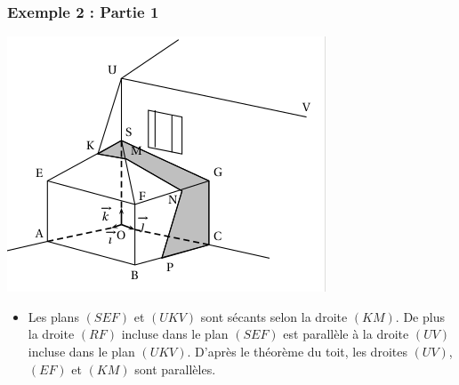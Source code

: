 \documentclass[xcolor=svgnames,t,final]{beamer}
\begin{document}
\begin{frame}

\frametitle{Exemple 2 : Partie 1}


\begin{center}
\includegraphics[scale=0.25]{images/exemple2.png}
\end{center}

\begin{itemize}
\pause \item {\color{blue}   Les plans $(SEF)$ et $(UKV)$ sont sécants selon la droite $(KM)$. De plus la droite $(RF)$ incluse dans le plan $(SEF)$ est parallèle à la droite $(UV)$ incluse dans le plan $(UKV)$. D'après le théorème du toit, les droites $(UV)$,  $(EF)$ et $(KM)$ sont parallèles.}

\end{itemize}
\end{frame}
\end{document}
